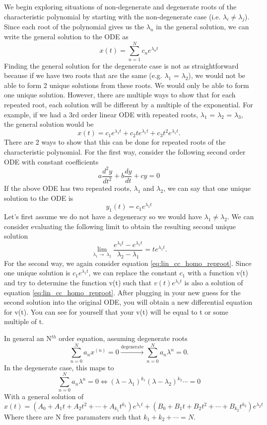 \documentclass{article}
\newcommand{\be}{\begin{equation}}
\newcommand{\ee}{\end{equation}}
\begin{document}
We begin exploring situations of non-degenerate and degenerate roots of the characteristic polynomial by starting with the non-degenerate case (i.e. $\lambda_i \neq \lambda_j$).
Since each root of the polynomial gives us the $\lambda_n$ in the general solution, we can write the general solution to the ODE as
\be
x(t) = \sum_{n=1}^N c_n e^{\lambda_n t}
\ee
Finding the general solution for the degenerate case is not as straightforward because if we have two roots that are the same (e.g. $\lambda_1$ = $\lambda_2$), we would not be able to form 2 unique solutions from these roots.
We would only be able to form one unique solution.
However, there are multiple ways to show that for each repeated root, each solution will be different by a multiple of the exponential.
For example, if we had a 3rd order linear ODE with repeated roots, $\lambda_1$ = $\lambda_2$ = $\lambda_3$, the general solution would be
\be
x(t) = c_1 e^{\lambda_1 t} + c_2 t e^{\lambda_1 t} + c_3 t^2 e^{\lambda_1 t} .
\ee
There are 2 ways to show that this can be done for repeated roots of the characteristic polynomial.
For the first way, consider the following second order ODE with constant coefficients
\be \label{eq:lin_cc_homo_reproot}
a\frac{d^2 y}{dt^2} + b\frac{d y}{dt} + cy = 0
\ee
If the above ODE has two repeated roots, $\lambda_1$ and $\lambda_2$, we can say that one unique solution to the ODE is
\be
y_1(t) = c_1 e^{\lambda_1 t}
\ee
Let's first assume we do not have a degeneracy so we would have $\lambda_1 \neq \lambda_2$.
We can consider evaluating the following limit to obtain the resulting second unique solution
\be
\lim_{\lambda_1\to\ \lambda_2} \frac{e^{\lambda_2 t} - e^{\lambda_1 t}}{\lambda_2 - \lambda_1} = t e^{\lambda_1 t} .
\ee
For the second way, we again consider equation \ref{eq:lin_cc_homo_reproot}.
Since one unique solution is $c_1 e^{\lambda_1 t}$, we can replace the constant $c_1$ with a function v(t) and try to determine the function v(t) such that $v(t) e^{\lambda_1 t}$ is also a solution of equation \ref{eq:lin_cc_homo_reproot}.
After plugging in your new guess for the second solution into the original ODE, you will obtain a new differential equation for v(t).
You can see for yourself that your v(t) will be equal to t or some multiple of t.

In general an N$^{th}$ order equation, assuming degenerate roots
\be
\sum_{n=0}^N a_n x^{(n)} = 0 \xrightarrow{\text{degenerate}} \sum_{n=0}^N a_n \lambda^n = 0 .
\ee
In the degenerate case, this maps to
\be
\sum_{n=0}^N a_n \lambda^n = 0 \Leftrightarrow (\lambda - \lambda_1)^{k_1} (\lambda - \lambda_2)^{k_2} \cdots = 0
\ee
With a general solution of
\be
x(t) = \left( A_0 + A_1t + A_2t^2 + \cdots + A_{k_1} t^{k_1}\right) e^{\lambda_1t} + \left( B_0 + B_1t + B_2t^2 + \cdots + B_{k_2} t^{k_2}\right) e^{\lambda_2t}
\ee
Where there are N free paramaters such that $k_1 + k_2 + \cdots = N$.
\end{document}
